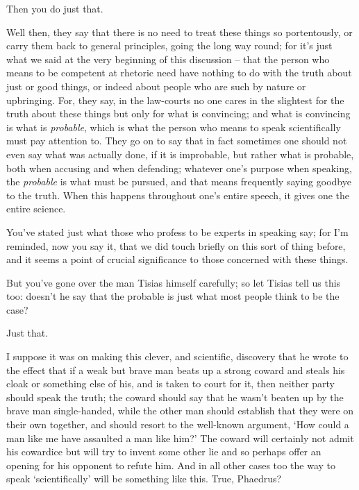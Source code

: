 Then you do just that. 

Well then, they say that there is no need to treat these things
so portentously, or carry them back to general principles, going the
long way round; for it's just what we said at the very beginning of this
discussion -- that the person who means to be competent at rhetoric need
have nothing to do  with the truth about just or good things, or
indeed about people who are such by nature or upbringing. For, they say,
in the law-courts no one cares in the slightest for the truth about
these things but only for what is convincing; and what is convincing
 is what is {\em probable}, which is what the person who means
to speak scientifically must pay attention to. They go on to say that in
fact sometimes one should not even say what was actually done, if it is
improbable, but rather what is probable, both when accusing and when
defending; whatever one's purpose when speaking, the {\em probable} is
what must be pursued, and  that means frequently saying goodbye
to the truth. When this happens throughout one's entire speech, it gives
one the entire  science.

You've stated just what those who profess to be experts in
speaking say; for I'm reminded, now you say it, that we did touch
briefly on this sort of thing before, and it seems  a point of
crucial significance to those concerned with these things.

But you've gone over the man Tisias himself carefully; so let
Tisias tell us this too: doesn't he say that the  probable is
just what most people think to be the case?

Just that.

I suppose it was on making this clever, and scientific,
discovery that he wrote to the effect that if a weak but brave 
man beats up a strong coward and steals his cloak or something else of
his, and is taken to court for it, then neither party should speak the
truth; the coward should say that he wasn't beaten up by the brave man
single-handed, while the other man should establish that they were on
their own together, and should  resort to the well-known
argument, ‘How could a man like me have assaulted a man like him?' The
coward will certainly not admit his cowardice but will try to invent
some other lie and so perhaps offer an opening for his opponent to
refute him. And in all other cases too the way to speak ‘scientifically'
will  be something like this. True, Phaedrus?

